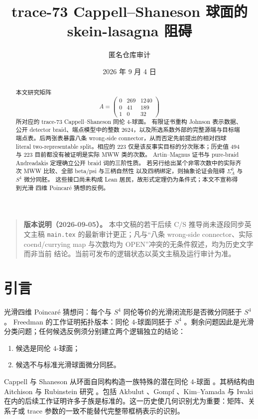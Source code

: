 \documentclass[11pt]{amsart}
\title[trace-73 阻碍]
{trace-73 Cappell--Shaneson 球面的\\
skein-lasagna 阻碍}
\author{匿名仓库审计}
\date{2026 年 9 月 4 日}
\theoremstyle{definition}
\theoremstyle{remark}
\begin{document}
\begin{abstract}
本文研究矩阵
\[
A=\begin{pmatrix}0&269&1240\\0&41&189\\1&0&32\end{pmatrix}
\]
所对应的 trace-73 Cappell--Shaneson 同伦 $4$-球面。
有限证书重构 Johnson 表示数据、公开 detector braid、端点模型中的整数
$2624$，以及所选系数外部的完整源端与目标端端点表。后两张表暴露八条
wrong-side connector，从而否定先前提出的相对四球 literal
two-representable split。相应的 $223$ 仅是该反事实目标的分次账本；历史值
$494$ 与 $223$ 目前都没有被证明是实际 MWW 类的次数。
Artin--Magnus 证书与 pure-braid Andreadakis 定理确立公开 braid 词的三阶性质。
若另行给出某个非零次数中的实际齐次 MWW 比较、全部 beta/psi 与三柄自然性
以及四柄绑定，则抽象论证会阻碍 $\Sigma_A^0$ 与 $S^4$ 微分同胚。
这些接口尚未构成 Lean 居民，故形式定理仍为条件式；本文不宣称得到光滑
四维 Poincaré 猜想的反例。
\end{abstract}

\maketitle
\tableofcontents

\begin{quote}\small
\textbf{版本说明（2026-09-05）。}
本中文稿的若干后续 C/S 推导尚未逐段同步英文主稿
\texttt{main.tex} 的最新审计更正；凡与“八条 wrong-side connector、实际
coend/currying map 与次数均为 OPEN”冲突的无条件叙述，均为历史文字而非当前
结论。当前可发布的逻辑状态以英文主稿及运行审计为准。
\end{quote}
\section{引言}

光滑四维 Poincaré 猜想问：每个与 $S^4$ 同伦等价的光滑闭流形是否微分同胚于 $S^4$。
Freedman 的工作证明拓扑版本：同伦 $4$-球面同胚于 $S^4$ \cite{Freedman1982}。剩余问题因此是光滑分类问题；任何候选反例须分别建立两个逻辑独立的结论：
\begin{enumerate}
\item 候选是同伦 $4$-球面；
\item 候选不与标准光滑球面微分同胚。
\end{enumerate}

Cappell 与 Shaneson 从环面自同构构造一族特殊的潜在同伦 $4$-球面 \cite{CappellShaneson1976}。其柄结构由 Aitchison 与 Rubinstein 研究 \cite{AitchisonRubinstein1984}。包括 Akbulut \cite{Akbulut2010}、Gompf \cite{Gompf2010}、Kim--Yamada \cite{KimYamada2017} 与 Iwaki \cite{Iwaki2024} 在内的后续工作证明许多子族是标准的。这一历史使几何识别尤为重要：矩阵、关系子或 trace 参数的一致不能替代完整带框柄表示的识别。
\end{document}
